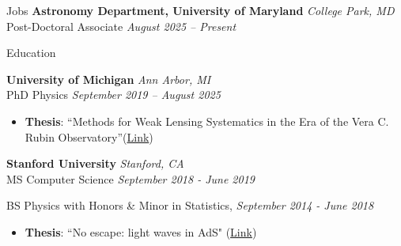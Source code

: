 \documentclass{resume} %
\begin{document}
\begin{rSection}{Jobs}
{\bf Astronomy Department, University of Maryland} \hfill {\em College Park, MD} 
\\ Post-Doctoral Associate \hfill {\em August 2025 -- Present}
\end{rSection}

\begin{rSection}{Education}

{\bf University of Michigan} \hfill {\em Ann Arbor, MI} 
\\ PhD Physics \hfill {\em September 2019 -- August 2025}
\vspace*{-0.1cm}
%
\vspace*{-0.01cm}
\begin{itemize}[itemsep=-0.25em] 

    \item 
    \textbf{Thesis}: ``Methods for Weak Lensing Systematics in the Era of the Vera C. Rubin Observatory''(\href{https://deepblue.lib.umich.edu/handle/2027.42/199148}{Link})

\end{itemize}

{\bf Stanford University} \hfill {\em Stanford, CA} 
\\ MS Computer Science \hfill {\em September 2018 - June 2019}
\vspace*{-0.1cm}
%


%
BS Physics with Honors \& Minor in Statistics, \hfill {\em September 2014 - June 2018}
%
\vspace*{-0.1cm}
\begin{itemize}[itemsep=-0.25em] 

    \item 
    \textbf{Thesis}: ``No escape: light waves in AdS" (\href{https://purl.stanford.edu/vf208qp2190}{Link})

\end{itemize}
%
\vspace*{-0.1cm}
\end{rSection}
\end{document}
